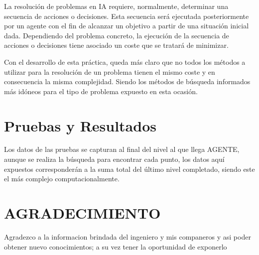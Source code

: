\documentclass[letterpaper, 10 pt, conference]{ieeeconf}  %
\begin{document}
La resolución de problemas en IA requiere, normalmente, determinar una secuencia de acciones o decisiones. Esta secuencia será ejecutada posteriormente por un agente con el fin de alcanzar un objetivo a partir de  una situación inicial dada. Dependiendo del problema concreto, la ejecución de la secuencia de acciones o decisiones tiene asociado un coste que se tratará de minimizar.

Con el desarrollo de esta práctica, queda más claro que no todos los métodos a utilizar para la resolución de un problema tienen el mismo coste y en consecuencia la misma complejidad. Siendo los métodos de búsqueda informados más idóneos para el tipo de problema expuesto en esta ocasión.

\addtolength{\textheight}{-12cm}   %







\section*{Pruebas y Resultados}

Los datos de las pruebas se capturan al final del nivel al que llega AGENTE, aunque se realiza la búsqueda para encontrar cada punto, los datos aquí expuestos corresponderán a la suma total del último nivel completado, siendo este el más complejo computacionalmente.

\section*{AGRADECIMIENTO}
Agradezco a la informacion brindada del ingeniero y mis companeros y asi poder obtener nuevo conocimientos; a su vez tener la oportunidad de exponerlo
\end{document}
